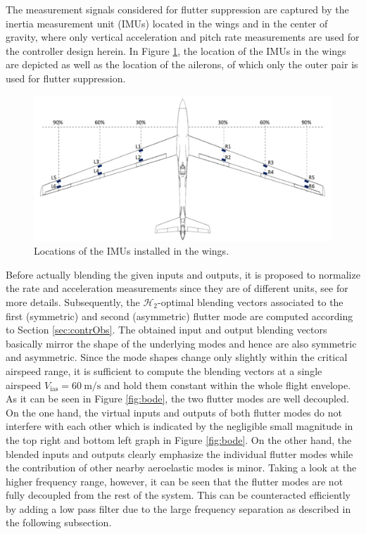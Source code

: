 \documentclass[aerospace,article,submit,moreauthors,pdftex,10pt,a4paper]{Definitions/mdpi}
\begin{document}
The measurement signals considered for flutter suppression are captured by the inertia measurement unit (\acp{IMU}) located in the wings and in the center of gravity, where only vertical acceleration and pitch rate measurements are used for the controller design herein.
In Figure \ref{fig:sens}, the location of the \acp{IMU} in the wings are depicted as well as the location of the ailerons, of which only the outer pair is used for flutter suppression.
%
\begin{figure}[!h]	
	\centering
	\includegraphics[width=0.75\linewidth]{figs/SensorPos}
	\caption{Locations of the \acp{IMU} installed in the wings.}
	\label{fig:sens}
\end{figure}
%
Before actually blending the given inputs and outputs, it is proposed to normalize the rate and acceleration measurements since they are of different units, see \cite{Pusch2018} for more details. Subsequently, the $\mathcal{H}_{2}$-optimal blending vectors associated to the first (symmetric) and second (asymmetric) flutter mode are computed according to Section \ref{sec:contrObs}. The obtained input and output blending vectors basically mirror the shape of the underlying modes and hence are also symmetric and asymmetric. Since the mode shapes change only slightly within the critical airspeed range, it is sufficient to compute the blending vectors at a single airspeed $V_\text{ias}=\SI{60}{\meter\per\second}$ and hold them constant within the whole flight envelope.
% 
As it can be seen in Figure \ref{fig:bode}, the two flutter modes are well decoupled. On the one hand, the virtual inputs and outputs of both flutter modes do not interfere with each other which is indicated by the negligible small magnitude in the top right and bottom left graph in Figure \ref{fig:bode}. On the other hand, the blended inputs and outputs clearly emphasize the individual flutter modes while the contribution of other nearby aeroelastic modes is minor. Taking a look at the higher frequency range, however, it can be seen that the flutter modes are not fully decoupled from the rest of the system. This can be counteracted efficiently by adding a low pass filter due to the large frequency separation as described in the following subsection.
\end{document}
